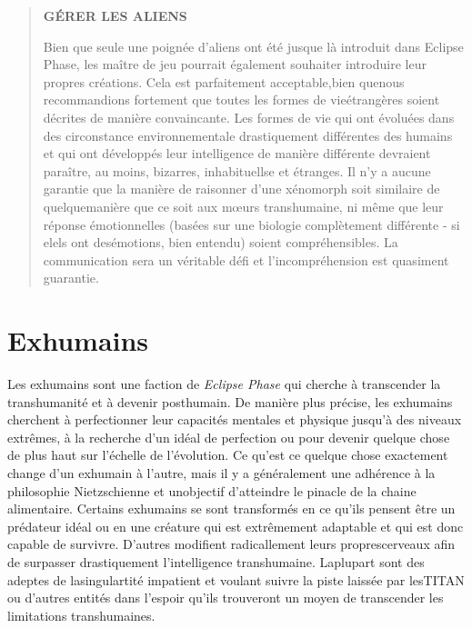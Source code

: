 \begin{quotation} \begin{large} \textbf{GÉRER LES ALIENS} \end{large} 

Bien que seule une poignée d'aliens ont été jusque là introduit dans Eclipse Phase, les maître de jeu pourrait également souhaiter introduire leur propres créations. Cela est parfaitement acceptable,bien quenous recommandions fortement que toutes les formes de vieétrangères soient décrites de manière convaincante. Les formes de vie qui ont évoluées dans des circonstance environnementale drastiquement différentes des humains et qui ont développés leur intelligence de manière différente devraient paraître, au moins, bizarres, inhabituellse et étranges. Il n'y a aucune garantie que la manière de raisonner d'une xénomorph  soit similaire de quelquemanière que ce soit aux mœurs transhumaine, ni même que leur réponse émotionnelles (basées sur une biologie complètement différente - si elels ont desémotions, bien entendu) soient compréhensibles. La communication sera un véritable défi et l'incompréhension est quasiment guarantie. \end{quotation} 



\section{Exhumains } 

Les exhumains sont une faction de \textit{Eclipse Phase} qui cherche à transcender la transhumanité et à devenir posthumain. De manière plus précise, les exhumains cherchent  à perfectionner leur capacités mentales et physique jusqu'à des niveaux extrêmes, à la recherche d'un idéal de perfection ou pour devenir quelque chose de plus haut sur l'échelle de l'évolution. Ce qu'est ce quelque chose exactement change d'un exhumain à l'autre, mais il y a généralement une adhérence à la philosophie Nietzschienne et unobjectif d'atteindre le pinacle de la chaine alimentaire. Certains exhumains se sont transformés en ce qu'ils pensent être un prédateur idéal ou en une créature qui est extrêmement adaptable et qui est donc capable de survivre. D'autres modifient radicallement leurs proprescerveaux afin de surpasser drastiquement l'intelligence transhumaine. Laplupart sont des adeptes de lasingulartité impatient et voulant suivre la piste laissée par lesTITAN ou d'autres entités dans l'espoir qu'ils trouveront un moyen de transcender les limitations transhumaines. 

